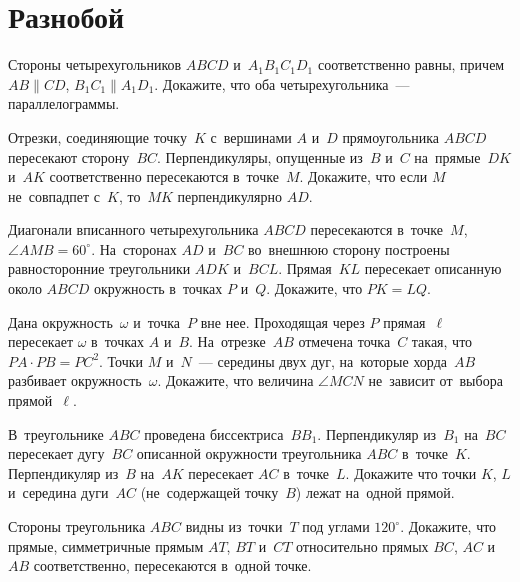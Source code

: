 
\section*{Разнобой}


\begin{problems}

\item
Стороны четырехугольников $ABCD$ и~$A_1 B_1 C_1 D_1$ соответственно равны,
причем $AB \parallel CD$, $B_1 C_1 \parallel A_1 D_1$.
Докажите, что оба четырехугольника~--- параллелограммы.

\item
Отрезки, соединяющие точку~$K$ с~вершинами $A$ и~$D$ прямоугольника $ABCD$
пересекают сторону~$BC$.
Перпендикуляры, опущенные из~$B$ и~$C$ на~прямые~$DK$ и~$AK$ соответственно
пересекаются в~точке~$M$.
Докажите, что если $M$ не~совпадпет с~$K$, то~$MK$ перпендикулярно $AD$.

\item
Диагонали вписанного четырехугольника $ABCD$ пересекаются в~точке~$M$,
$\angle AMB = 60^{\circ}$.
На~сторонах $AD$ и~$BC$ во~внешнюю сторону построены равносторонние
треугольники $ADK$ и~$BCL$.
Прямая~$KL$ пересекает описанную около $ABCD$ окружность в~точках $P$ и~$Q$.
Докажите, что $PK = LQ$.

\item
Дана окружность~$\omega$ и~точка~$P$ вне нее.
Проходящая через $P$ прямая~$\ell$ пересекает $\omega$ в~точках $A$ и~$B$.
На~отрезке~$AB$ отмечена точка~$C$ такая, что $PA \cdot PB = PC^2$.
Точки $M$ и~$N$~--- середины двух дуг, на~которые хорда~$AB$ разбивает
окружность~$\omega$.
Докажите, что величина $\angle MCN$ не~зависит от~выбора прямой~$\ell$.

\item
В~треугольнике $ABC$ проведена биссектриса~$B B_1$.
Перпендикуляр из~$B_1$ на~$BC$ пересекает дугу~$BC$ описанной окружности
треугольника $ABC$ в~точке~$K$.
Перпендикуляр из~$B$ на~$AK$ пересекает $AC$ в~точке~$L$.
Докажите что точки $K$, $L$  и~середина дуги~$AC$ (не~содержащей точку~$B$)
лежат на~одной прямой.

\item
Стороны треугольника $ABC$ видны из~точки~$T$ под углами $120^\circ$.
Докажите, что прямые, симметричные прямым $AT$, $BT$ и~$CT$ относительно прямых
$BC$, $AC$ и~$AB$ соответственно, пересекаются в~одной точке.


\end{problems}
